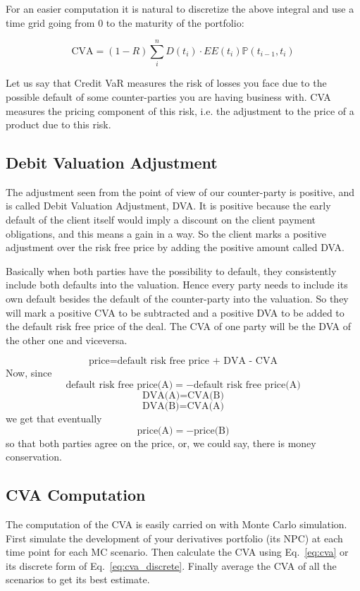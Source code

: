 For an easier computation it is natural to discretize the above integral
and use a time grid going from 0 to the maturity of the portfolio:

\begin{equation}
\text{CVA} = (1-R) \sum_i^n D(t_i) \cdot EE(t_i) \mathbb{P}(t_{i-1}, t_i)
\label{eq:cva_discrete}
\end{equation}

Let us say that Credit VaR measures the risk of losses you
face due to the possible default of some counter-parties you are having
business with. CVA measures the pricing component of this risk, i.e.
the adjustment to the price of a product due to this risk.

\subsection{Debit Valuation Adjustment}

The adjustment seen from the point of view of our counter-party is positive, and is called Debit Valuation Adjustment, DVA. It is positive because the early default of the client itself would imply a discount on the client payment obligations, and this means a gain in a way. So the client marks a positive adjustment over the risk free price by adding the positive amount called DVA. 

Basically when both parties have the possibility to default, they
consistently include both defaults into the valuation. Hence
every party needs to include its own default besides the default of the
counter-party into the valuation. So they will mark a positive
CVA to be subtracted and a positive DVA to be added to the default
risk free price of the deal. The CVA of one party will be the DVA of
the other one and viceversa.

\[
\textrm{price}=\textrm{default risk free price + DVA - CVA}
\]
Now, since
\[
\textrm{default risk free price(A)} = - \textrm{default risk free price(A)}
\]
\[
\textrm{DVA(A)} = \textrm{CVA(B)}
\]
\[
\textrm{DVA(B)} = \textrm{CVA(A)}
\]
we get that eventually
\[
\textrm{price(A)} = -\textrm{price(B)}
\]
so that both parties agree on the price, or, we could say, there is money
conservation.

\subsection{CVA Computation}

The computation of the CVA is easily carried on with Monte Carlo simulation.
First simulate the development of your derivatives portfolio (its NPC) at each time point for each MC scenario. 
Then calculate the CVA using Eq.~\ref{eq:cva} or its discrete form of Eq.~\ref{eq:cva_discrete}.
Finally average the CVA of all the scenarios to get its best estimate.





